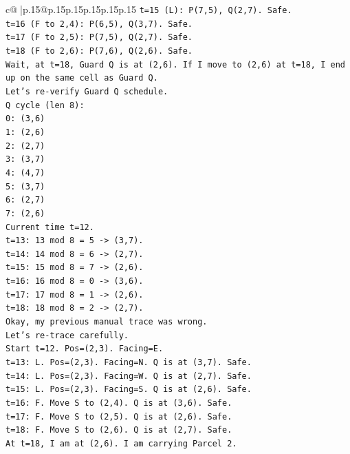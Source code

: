 \documentclass{article}
\begin{document}
{\begin{supertabular}{c@{$\;$}|p{.15\linewidth}@{}p{.15\linewidth}p{.15\linewidth}p{.15\linewidth}p{.15\linewidth}p{.15\linewidth}}
{{{\texttt{t=15 (L): P(7,5), Q(2,7). Safe.} \\
\texttt{t=16 (F to 2,4): P(6,5), Q(3,7). Safe.} \\
\texttt{t=17 (F to 2,5): P(7,5), Q(2,7). Safe.} \\
\texttt{t=18 (F to 2,6): P(7,6), Q(2,6). Safe.} \\
\texttt{Wait, at t=18, Guard Q is at (2,6). If I move to (2,6) at t=18, I end up on the same cell as Guard Q.} \\
\texttt{Let's re{-}verify Guard Q schedule.} \\
\texttt{Q cycle (len 8):} \\
\texttt{0: (3,6)} \\
\texttt{1: (2,6)} \\
\texttt{2: (2,7)} \\
\texttt{3: (3,7)} \\
\texttt{4: (4,7)} \\
\texttt{5: (3,7)} \\
\texttt{6: (2,7)} \\
\texttt{7: (2,6)} \\
\texttt{Current time t=12.} \\
\texttt{t=13: 13 mod 8 = 5 {-}> (3,7).} \\
\texttt{t=14: 14 mod 8 = 6 {-}> (2,7).} \\
\texttt{t=15: 15 mod 8 = 7 {-}> (2,6).} \\
\texttt{t=16: 16 mod 8 = 0 {-}> (3,6).} \\
\texttt{t=17: 17 mod 8 = 1 {-}> (2,6).} \\
\texttt{t=18: 18 mod 8 = 2 {-}> (2,7).} \\
\texttt{Okay, my previous manual trace was wrong.} \\
\texttt{Let's re{-}trace carefully.} \\
\texttt{Start t=12. Pos=(2,3). Facing=E.} \\
\texttt{t=13: L. Pos=(2,3). Facing=N. Q is at (3,7). Safe.} \\
\texttt{t=14: L. Pos=(2,3). Facing=W. Q is at (2,7). Safe.} \\
\texttt{t=15: L. Pos=(2,3). Facing=S. Q is at (2,6). Safe.} \\
\texttt{t=16: F. Move S to (2,4). Q is at (3,6). Safe.} \\
\texttt{t=17: F. Move S to (2,5). Q is at (2,6). Safe.} \\
\texttt{t=18: F. Move S to (2,6). Q is at (2,7). Safe.} \\
\texttt{At t=18, I am at (2,6). I am carrying Parcel 2.} \\
}}}
\end{supertabular}}
\end{document}
